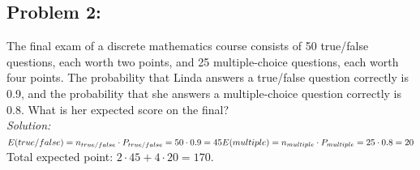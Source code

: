 \documentclass[a4paper]{article}
\begin{document}
\subsection*{Problem 2:}
The final exam of a discrete mathematics course consists of 50 true/false questions, each worth two points, and 25 multiple-choice questions, each worth four points. The probability that Linda answers a true/false question correctly is 0.9, and the probability that she answers a multiple-choice question correctly is 0.8. What is her expected score on the final? \\
\textit{Solution:} \\
\begin{math}
	E(true/false) = n_{true/false} \cdot P_{true/false} = 50 \cdot 0.9 = 45 \\
	E(multiple) = n_{multiple} \cdot P_{multiple} = 25 \cdot 0.8 = 20
\end{math} \\
Total expected point: $2\cdot45+4\cdot20=170$.

\end{document}
